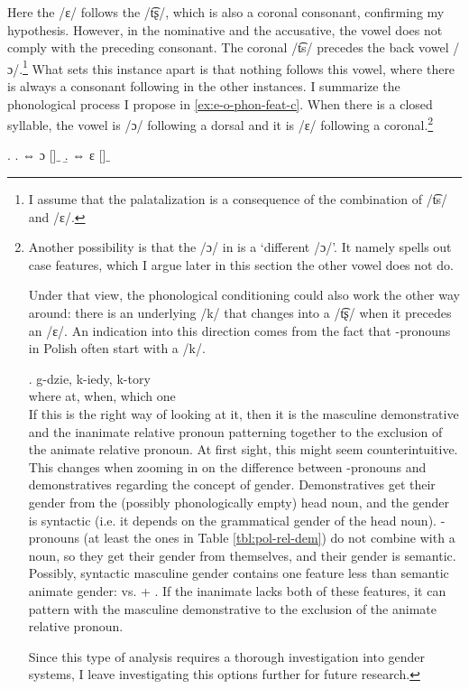 Here the /ɛ/ follows the /t͡ʂ/, which is also a coronal consonant, confirming my hypothesis. However, in the nominative and the accusative, the vowel does not comply with the preceding consonant. The coronal /t͡s/ precedes the back vowel /ɔ/.\footnote{
I assume that the palatalization is a consequence of the combination of /t͡s/ and /ɛ/.
}
What sets this instance apart is that nothing follows this vowel, where there is always a consonant following in the other instances. I summarize the phonological process I propose in \ref{ex:e-o-phon-feat-c}. When there is a closed syllable, the vowel is /ɔ/ following a dorsal and it is /ɛ/ following a coronal.\footnote{
Another possibility is that the /ɔ/ in  is a `different /ɔ/'. It namely spells out case features, which I argue later in this section the other vowel does not do.

Under that view, the phonological conditioning could also work the other way around: there is an underlying /k/ that changes into a /t͡ʂ/ when it precedes an /ɛ/. An indication into this direction comes from the fact that -pronouns in Polish often start with a /k/.

\exg. g-dzie, k-iedy, k-tory\\
where at, when, which one\\

If this is the right way of looking at it, then it is the masculine demonstrative and the inanimate relative pronoun patterning together to the exclusion of the animate relative pronoun. At first sight, this might seem counterintuitive. This changes when zooming in on the difference between -pronouns and demonstratives regarding the concept of gender. Demonstratives get their gender from the (possibly phonologically empty) head noun, and the gender is syntactic (i.e. it depends on the grammatical gender of the head noun). -pronouns (at least the ones in Table \ref{tbl:pol-rel-dem}) do not combine with a noun, so they get their gender from themselves, and their gender is semantic. Possibly, syntactic masculine gender contains one feature less than semantic animate gender:  vs.  + . If the inanimate lacks both of these features, it can pattern with the masculine demonstrative to the exclusion of the animate relative pronoun.

Since this type of analysis requires a thorough investigation into gender systems, I leave investigating this options further for future research.
}

\ex.\label{ex:e-o-phon-feat-c}
\a.  ⇔ ɔ []$\_$
\b.  ⇔ ɛ []$\_$

